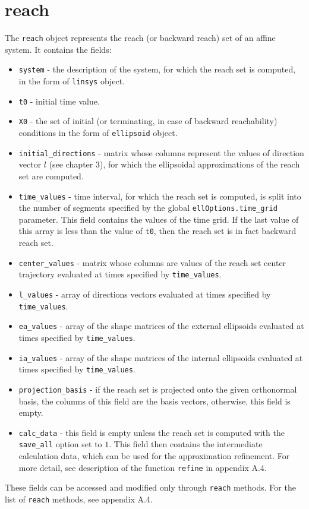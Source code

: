 \documentclass{report}
\begin{document}
\section{reach}
The {\tt reach} object represents the reach (or backward reach)
set of an affine system. It contains the fields:
\begin{itemize}
\item {\tt system} - the description of the system, for which the reach set
is computed, in the form of {\tt linsys} object.
\item {\tt t0} - initial time value.
\item {\tt X0} - the set of initial (or terminating, in case of backward
reachability) conditions in the form of {\tt ellipsoid}
object.
\item {\tt initial\_directions} - matrix whose columns represent the values
of direction vector $l$ (see chapter 3), for which the ellipsoidal
approximations of the reach set are computed.
\item {\tt time\_values} - time interval, for which the reach set is computed,
is split into the number of segments specified by the global
{\tt ellOptions.time\_grid} parameter. This field contains the values
of the time grid. If the last value of this array is less than the value
of {\tt t0}, then the reach set is in fact backward reach set.
\item {\tt center\_values} - matrix whose columns are values of the reach set
center trajectory evaluated at times specified by {\tt time\_values}.
\item {\tt l\_values} - array of directions vectors evaluated at times
specified by {\tt time\_values}.
\item {\tt ea\_values} - array of the shape matrices of the external ellipsoids
evaluated at times specified by {\tt time\_values}.
\item {\tt ia\_values} - array of the shape matrices of the internal ellipsoids
evaluated at times specified by {\tt time\_values}.
\item {\tt projection\_basis} - if the reach set is projected onto the given
orthonormal basis, the columns of this field are the basis vectors, otherwise,
this field is empty.
\item {\tt calc\_data} - this field is empty unless the reach set is computed
with the {\tt save\_all} option set to $1$. This field then contains the
intermediate calculation data, which can be used for the approximation
refinement. For more detail, see description of the function
{\tt refine} in appendix A.4.
\end{itemize}
These fields can be accessed and modified only through {\tt reach} methods.
For the list of {\tt reach} methods, see appendix A.4.
\end{document}
